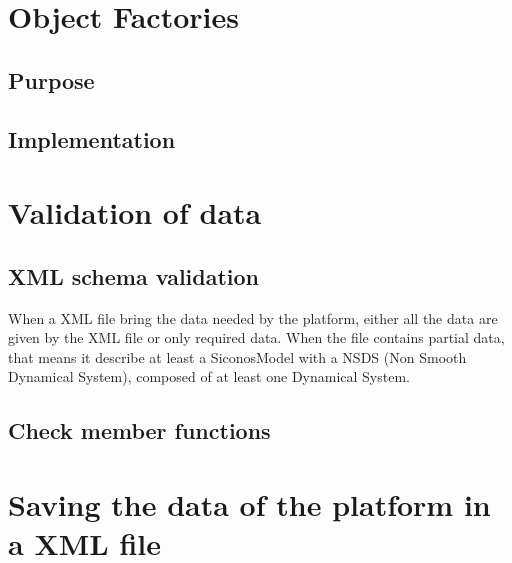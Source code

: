 \section{Object Factories}

\subsection{Purpose}

\subsection{Implementation}

\clearpage



\label{Sec:DDD-XMLLoading}



\clearpage
 \section{Validation of data}
\subsection{XML schema validation}
When a XML file bring the data needed by the platform, either all the data are given by the XML file or only required data. When the file contains partial data, that means it describe at least a SiconosModel with a NSDS (Non Smooth Dynamical System), composed of at least one Dynamical System.

\subsection{Check member functions}



\clearpage
\section{Saving the data of the platform in a XML file}



